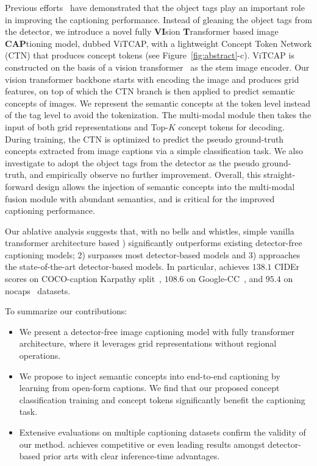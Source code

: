 Previous efforts~\citep{li2020oscar,hu2020vivo,zhang2021multi,wang2020minivlm,fang2021compressing} have demonstrated that the object tags play an important role in improving the captioning performance. 
Instead of gleaning the object tags from the detector, we introduce a novel fully \textbf{VI}sion \textbf{T}ransformer based image \textbf{CAP}tioning model, dubbed ViTCAP, with a lightweight Concept Token Network (CTN) that produces concept tokens (see Figure~\ref{fig:abstract}{\color{black}-c}). 
ViTCAP is constructed on the basis of a vision transformer~\citep{dosovitskiy2020image} as the stem image encoder. Our vision transformer backbone starts with encoding the image and produces grid features, on top of which the CTN branch is then applied to predict semantic concepts of images. We represent the semantic concepts at the token level instead of the tag level to avoid the tokenization. 
The multi-modal module then takes the input of both grid representations and Top-$K$ concept tokens for decoding. During training, the CTN is optimized to predict the pseudo ground-truth concepts extracted from image captions via a simple classification task. We also investigate to adopt the object tags from the detector as the pseudo ground-truth, and empirically observe no further improvement. Overall, this straight-forward design allows the injection of semantic concepts into the multi-modal fusion module with abundant semantics, and is critical for the improved captioning performance.

Our ablative analysis suggests that, with no bells and whistles, simple vanilla transformer architecture based ) significantly outperforms existing detector-free captioning models;
2) surpasses most detector-based models and 3) approaches the state-of-the-art detector-based models. 
In particular, \vitcap achieves $138.1$ CIDEr scores on COCO-caption Karpathy split~\citep{lin2014microsoft}, $108.6$ on Google-CC~\citep{sharma2018conceptual}, and $95.4$ on nocaps~\citep{agrawal2019nocaps} datasets.

\noindent To summarize our contributions:
\begin{itemize} [leftmargin=8pt]
    \item We present a detector-free image captioning model  \vitcap\!\! with fully transformer architecture, where it leverages grid representations without regional operations. 
    \item We propose to inject semantic concepts into end-to-end captioning by learning from open-form captions. We find that our proposed concept classification training and concept tokens significantly benefit the captioning task.
    \item Extensive evaluations on multiple captioning datasets confirm the validity of our method. \vitcap achieves competitive or even leading results amongst detector-based prior arts with clear inference-time advantages.
\end{itemize}


